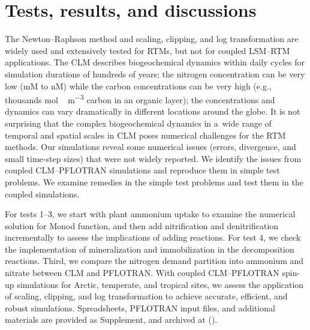 \documentclass[gmd,noline]{copernicus}
\begin{document}
\section{Tests, results, and discussions}%

      The Newton--Raphson method and scaling, clipping, and log
      transformation are widely used and extensively tested for RTMs, but
      not for coupled LSM--RTM applications. The CLM describes biogeochemical
      dynamics within daily cycles for simulation durations of hundreds of
      years; the nitrogen concentration can be very low (\unit{mM} to
      \unit{nM}) while the carbon concentrations can be very high (e.g.,
      thousands \unit{mol\,m^{-3}} carbon in an organic layer); the
      concentrations and dynamics can vary dramatically in different
      locations around the globe. It is not surprising that the complex
      biogeochemical dynamics in a~wide range of temporal and spatial scales
      in CLM poses numerical challenges for the RTM methods. Our simulations
      reveal some numerical issues (errors, divergence, and small time-step
      sizes) that were not widely reported. We identify the issues from
      coupled CLM--PFLOTRAN simulations and reproduce them in simple test
      problems. We examine remedies in the simple test problems and test
      them in the coupled simulations.

      For tests 1--3, we start with plant ammonium uptake to examine the
      numerical solution for Monod function, and then add nitrification and
      denitrification incrementally to assess the implications of adding
      reactions. For test 4, we check the implementation of mineralization
      and immobilization in the decomposition reactions. Third, we compare
      the nitrogen demand partition into ammonium and nitrate between CLM
      and PFLOTRAN. With coupled CLM--PFLOTRAN spin-up simulations for
      Arctic, temperate, and tropical sites, we assess the application of
      scaling, clipping, and log transformation to achieve accurate,
      efficient, and robust simulations. Spreadsheets, PFLOTRAN input
      files, and additional materials are provided as Supplement, and archived
      at \citeauthor{Tang2016}(\citeyear{Tang2016}).
\end{document}
